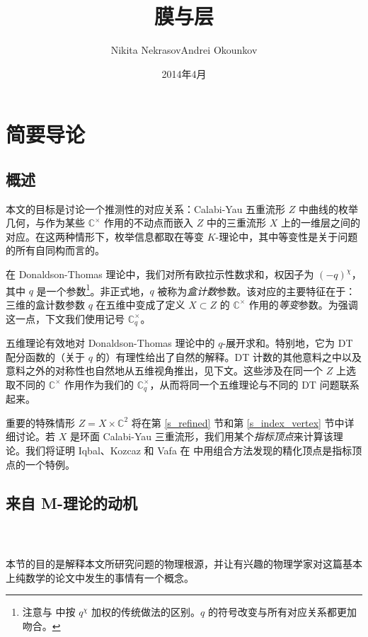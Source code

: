 \documentclass[12pt]{article}
\newcommand{\C}{\mathbb{C}}
\newcommand{\Ct}{\mathbb{C}^{\times}}
\newcommand{\Cq}{\Ct_q}
\theoremstyle{definition}
\begin{document}
\title{膜与层}
\author{Nikita Nekrasov\quad Andrei Okounkov}
\date{2014年4月}
\maketitle

\setcounter{tocdepth}{2}
\tableofcontents
\section{简要导论}

\subsection{概述}

本文的目标是讨论一个推测性的对应关系：Calabi-Yau 五重流形 $Z$ 中曲线的枚举几何，与作为某些 $\Ct$ 作用的不动点而嵌入 $Z$ 中的三重流形 $X$ 上的一维层之间的对应。在这两种情形下，枚举信息都取在等变 $K$-理论中，其中等变性是关于问题的所有自同构而言的。

在 Donaldson-Thomas 理论中，我们对所有欧拉示性数求和，权因子为 $(-q)^{\chi}$，其中 $q$ 是一个参数\footnote{注意与 \cite{mnop} 中按 $q^{\chi}$ 加权的传统做法的区别。$q$ 的符号改变与所有对应关系都更加吻合。}。非正式地，$q$ 被称为\emph{盒计数}参数。该对应的主要特征在于：三维的盒计数参数 $q$ 在五维中变成了定义 $X\subset Z$ 的 $\Ct$ 作用的\emph{等变}参数。为强调这一点，下文我们使用记号 $\Cq$。

五维理论有效地对 Donaldson-Thomas 理论中的 $q$-展开求和。特别地，它为 DT 配分函数的（关于 $q$ 的）有理性给出了自然的解释。DT 计数的其他意料之中以及意料之外的对称性也自然地从五维视角推出，见下文。这些涉及在同一个 $Z$ 上选取不同的 $\Ct$ 作用作为我们的 $\Cq$，从而将同一个五维理论与不同的 DT 问题联系起来。

重要的特殊情形 $Z=X \times \C^2$ 将在第 \ref{s_refined} 节和第 \ref{s_index_vertex} 节中详细讨论。若 $X$ 是环面 Calabi-Yau 三重流形，我们用某个\emph{指标顶点}来计算该理论。我们将证明 Iqbal、Kozcaz 和 Vafa 在 \cite{IKV} 中用组合方法发现的精化顶点是指标顶点的一个特例。

\subsection{来自 M-理论的动机}

\subsubsection{\ }

本节的目的是解释本文所研究问题的物理根源，并让有兴趣的物理学家对这篇基本上纯数学的论文中发生的事情有一个概念。
\end{document}
